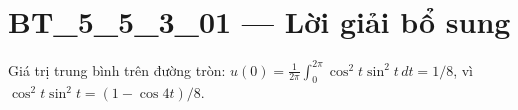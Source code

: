 \documentclass[10pt,a4paper]{article}
\begin{document}
\section*{BT\_5\_5\_3\_01 — Lời giải bổ sung}
Giá trị trung bình trên đường tròn: $u(0)=\frac1{2\pi}\int_0^{2\pi}\cos^2t\sin^2t\,dt=1/8$, vì $\cos^2t\sin^2t=(1-\cos4t)/8$.
\end{document}
